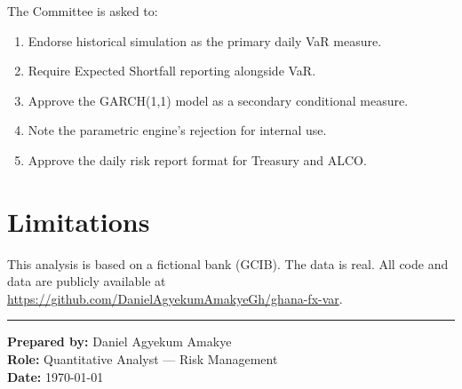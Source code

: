\documentclass[11pt,a4paper]{article}
\begin{document}
The Committee is asked to:

\begin{enumerate}
  \item Endorse historical simulation as the primary daily VaR measure.
  \item Require Expected Shortfall reporting alongside VaR.
  \item Approve the GARCH(1,1) model as a secondary conditional measure.
  \item Note the parametric engine's rejection for internal use.
  \item Approve the daily risk report format for Treasury and ALCO.
\end{enumerate}

\section*{Limitations}

This analysis is based on a fictional bank (GCIB). The data is real.
All code and data are publicly available at
\url{https://github.com/DanielAgyekumAmakyeGh/ghana-fx-var}.

\vspace{1.5cm}
\noindent\rule{\textwidth}{0.4pt}

\noindent\textbf{Prepared by:} Daniel Agyekum Amakye \\
\textbf{Role:} Quantitative Analyst --- Risk Management \\
\textbf{Date:} \today
\end{document}
